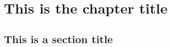\documentclass[12pt, twoside]{report} %
\begin{document}
\chapter{This is the chapter title}
\lipsum[1]

\section{This is a section title}
\lipsum[2-6]
\end{document}

